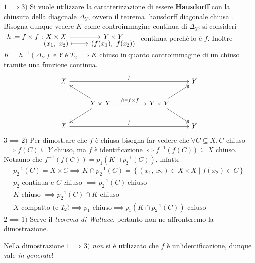 \begin{demonstration}
	$1 \implies 3)$  Si vuole utilizzare la caratterizzazione di essere \textbf{Hausdorff} con la chiusura della diagonale $\Delta_Y$, ovvero il teorema \ref{hausdorff diagonale chiusa}. Bisogna dunque vedere $K$ come controimmagine continua di $\Delta_Y$: si consideri	 $\funztot {h\coloneqq f\times f} {X\times X} {Y\times Y} {(x_1,\ x_2)} {\left( f(x_1), \ f(x_2) \right) }$ continua perché lo è $f$. Inoltre $K=h^{-1}(\Delta_Y)$ e $Y$ è $T_2 \implies K$ chiuso in quanto controimmagine di un chiuso tramite una funzione continua.
	\[ 	\begin{tikzcd}
				X \arrow[rrrr, "f"] &                                                                          &  &                                                       & Y \\
				& X\times X \arrow[rr, "h=f\times f" ,dotted] \arrow[lu, two heads] \arrow[ld, two heads] &  & Y\times Y \arrow[ru, two heads] \arrow[rd, two heads] &   \\
				X \arrow[rrrr, "f"] &                                                                          &  &                                                       & Y	
			\end{tikzcd} \]	
	$3\implies 2)$ Per dimostrare che $f$ è chiusa bisogna far vedere che $\forall C\subseteq X, C$ chiuso $\implies f(C)\subseteq Y$ chiuso, ma $f$ è identificazione $\iff f^{-1}\left( f(C) \right)\subseteq X$ chiuso. Notiamo che $f^{-1}\left( f(C) \right)= p_1(K\cap p_2^{-1}(C))$, infatti
		\begin{gather*}
			p_2^{-1}(C)=X\times C \implies K\cap p_2^{-1}(C)= \left\{ (x_1,\ x_2)\in X\times X \mid f(x_2)\in C \right\}\\
			p_2 \text{ continua e $C$ chiuso } \implies p_2^{-1}(C) \text{ chiuso} \\
			K \text{ chiuso }\implies p_2^{-1}(C)\cap K \text{ chiuso}\\
			X \text{ compatto (e } T_2) \implies p_1 \text{ chiuso}\implies p_1 \left( K\cap p_2^{-1}(C) \right) \text{ chiuso}
		\end{gather*}
	$2\implies 1)$ Serve il \textit{teorema di Wallace}, pertanto non ne affronteremo la dimostrazione.
\end{demonstration}
\begin{observe}
	Nella dimostrazione $1\implies 3)$ \textit{non} si è utilizzato che $f$ è un'identificazione, dunque vale \textit{in generale}!
\end{observe}
